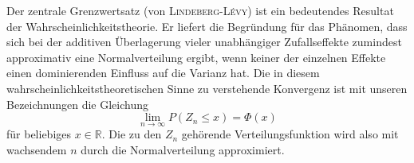 \documentclass[%
11pt,%
twoside,%
titlepage,%
german,%
headsepline%
]{scrartcl}
\newcounter{theo}[section]\setcounter{theo}{0}
\begin{document}
Der zentrale Grenzwertsatz (von \textsc{Lindeberg-Lévy}) ist ein bedeutendes Resultat der Wahrscheinlichkeitstheorie. Er liefert die Begründung für das Phänomen, dass sich bei der additiven Überlagerung vieler unabhängiger Zufallseffekte zumindest approximativ eine Normalverteilung ergibt, wenn keiner der einzelnen Effekte einen dominierenden Einfluss auf die Varianz hat. Die in diesem wahrscheinlichkeitstheoretischen Sinne zu verstehende Konvergenz ist mit unseren Bezeichnungen die Gleichung
$$\lim_{n\to\infty} P(Z_n\leq x)=\Phi(x)$$
für beliebiges $x\in\mathbb{R}$.
Die zu den $Z_n$ gehörende Verteilungsfunktion wird also mit wachsendem $n$ durch die Normalverteilung approximiert.



\cleardoublepage
\listoffigures
\listoftables
%
%
\end{document}
